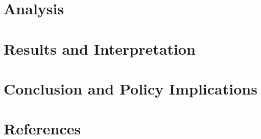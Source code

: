 \documentclass[
]{article}
\begin{document}
\newpage

\section{Analysis}\label{analysis}

\newpage

\section{Results and Interpretation}\label{results-and-interpretation}

\newpage

\section{Conclusion and Policy
Implications}\label{conclusion-and-policy-implications}

\newpage

\section{References}\label{references}
\end{document}
